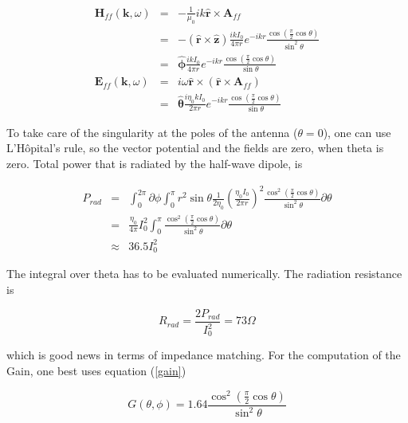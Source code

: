 \documentclass[a4paper,14pt]{extbook}
\begin{document}
\begin{eqnarray}
\mathbf{H}_{ff} (\mathbf{k},\omega)&=&  - \frac{1}{\mu_0} ik\mathbf{\hat{r}} \times \mathbf{A}_{ff} \label{hwd_Hff} \\
&=& -(\mathbf{\hat{r} }\times\mathbf{ \hat{z}})  \frac{ik I_0}{4 \pi r} e^{-ikr} \frac{\cos (\frac{\pi}{2} \cos \theta)}{\sin^2 \theta}\nonumber \\
&=& \mathbf{\hat{\phi}}  \frac{ik I_0}{4 \pi r} e^{-ikr} \frac{\cos (\frac{\pi}{2} \cos \theta)}{\sin \theta} \nonumber \\
\mathbf{E}_{ff} (\mathbf{k},\omega)&=&  i \omega \mathbf{\hat{r}} \times ( \mathbf{\hat{r}} \times \mathbf{A}_{ff}) \label{hwd_Eff} \\
&=& \mathbf{\hat{\theta}} \frac{i \eta_0 k I_0}{2 \pi r} e^{-ikr} \frac{\cos (\frac{\pi}{2} \cos \theta)}{\sin \theta} \nonumber
\end{eqnarray}

To take care of the singularity at the poles of the antenna ($\theta=0$), one can use L'H\^{o}pital's rule, so the vector potential and the fields are zero, when theta is zero. Total power that is radiated by the half-wave dipole, is

\begin{eqnarray}\label{total_power_hwd}
P_{rad} &=& \int_0^{2\pi } \partial \phi \int_0^{\pi} r^2 \sin \theta \frac{1}{2 \eta_0} \left( \frac{\eta_0 I_0}{2 \pi r} \right)^2  \frac{\cos^2 (\frac{\pi}{2} \cos \theta)}{\sin^2 \theta} \partial \theta  \\
&=& \frac{\eta_0}{4 \pi} I_0^2 \int_0^{\pi} \frac{\cos^2 (\frac{\pi}{2} \cos \theta)}{\sin^2 \theta} \partial \theta \nonumber \\
&\approx& 36.5 I_0^2 \nonumber
\end{eqnarray}

The integral over theta has to be evaluated numerically. The radiation resistance is

\begin{equation}\label{radiation_resistance_hwd}
R_{rad} = \frac{2 P_{rad}}{I_0^2}=73 \Omega
\end{equation}

which is good news in terms of impedance matching. For the computation of the Gain, one best uses equation (\ref{gain})

\begin{equation}\label{gain_hwd}
G( \theta , \phi )= 1.64 \frac{\cos^2 (\frac{\pi}{2} \cos \theta)}{\sin^2 \theta}
\end{equation}
\end{document}

